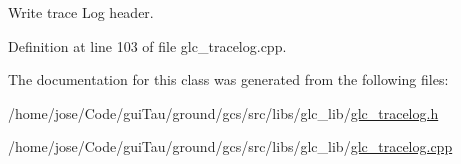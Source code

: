 Write trace Log header. 



Definition at line 103 of file glc\-\_\-tracelog.\-cpp.



The documentation for this class was generated from the following files\-:\begin{DoxyCompactItemize}
\item 
/home/jose/\-Code/gui\-Tau/ground/gcs/src/libs/glc\-\_\-lib/\hyperlink{glc__tracelog_8h}{glc\-\_\-tracelog.\-h}\item 
/home/jose/\-Code/gui\-Tau/ground/gcs/src/libs/glc\-\_\-lib/\hyperlink{glc__tracelog_8cpp}{glc\-\_\-tracelog.\-cpp}\end{DoxyCompactItemize}
